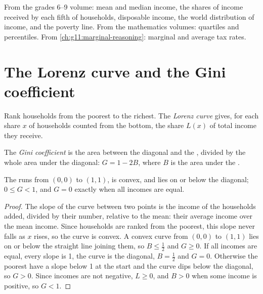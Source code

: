 \begin{recall}
From the grades 6--9 volume: mean and median income, the shares of income received by each fifth of households, disposable income, the world distribution of income,
and the poverty line. From the mathematics volumes: quartiles and percentiles. From \cref{ch:g11:marginal-reasoning}: marginal and average tax rates.
\end{recall}

\section{The Lorenz curve and the Gini coefficient}\label{sec:g11:inequality:lorenz}

\begin{definition}\label{def:g11:inequality:lorenz}
Rank households from the poorest to the richest. The \emph{Lorenz curve} gives, for each share $x$ of households counted from the bottom, the
share $L(x)$ of total income they receive.
\end{definition}

\begin{definition}\label{def:g11:inequality:gini}
The \emph{Gini coefficient} is the area between the diagonal and the , divided by the whole area under the diagonal:
$G = 1 - 2B$, where $B$ is the area under the .
\end{definition}

\begin{proposition}\label{prop:g11:inequality:properties}
The  runs from $(0,0)$ to $(1,1)$, is convex, and lies on or below the diagonal; $0 \le G < 1$, and $G = 0$ exactly when all incomes are equal.
\end{proposition}
\begin{proof}
The slope of the curve between two points is the income of the households added, divided by their number, relative to the mean: their average income over the mean
income. Since households are ranked from the poorest, this slope never falls as $x$ rises, so the curve is convex. A convex curve from $(0,0)$ to $(1,1)$ lies on or below
the straight line joining them, so $B \le \tfrac12$ and $G \ge 0$. If all incomes are equal, every slope is 1, the curve is the diagonal, $B = \tfrac12$ and $G = 0$.
Otherwise the poorest have a slope below 1 at the start and the curve dips below the diagonal, so $G > 0$. Since incomes are not negative, $L \ge 0$, and $B > 0$ when
some income is positive, so $G < 1$.
\end{proof}

